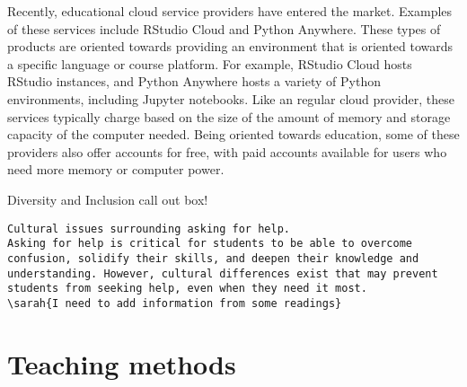 Recently, educational cloud service providers have entered the market.
Examples of these services include RStudio Cloud and Python Anywhere. 
These types of products are oriented towards providing an environment that is oriented towards a specific language or course platform. 
For example, RStudio Cloud hosts RStudio instances, and Python Anywhere hosts a variety of Python environments, including Jupyter notebooks. 
Like an regular cloud provider, these services typically charge based on the size of the amount of memory and storage capacity of the computer needed.
Being oriented towards education, some of these providers also offer accounts for free, with paid accounts available for users who need more memory or computer power.






{\begin{framed}
Diversity and Inclusion call out box! 
\begin{snugshade*}
\begin{lstlisting}
Cultural issues surrounding asking for help.
Asking for help is critical for students to be able to overcome confusion, solidify their skills, and deepen their knowledge and understanding. However, cultural differences exist that may prevent students from seeking help, even when they need it most. 
\sarah{I need to add information from some readings}
\end{lstlisting}
\end{snugshade*}
\end{framed}}

\section{Teaching methods}


